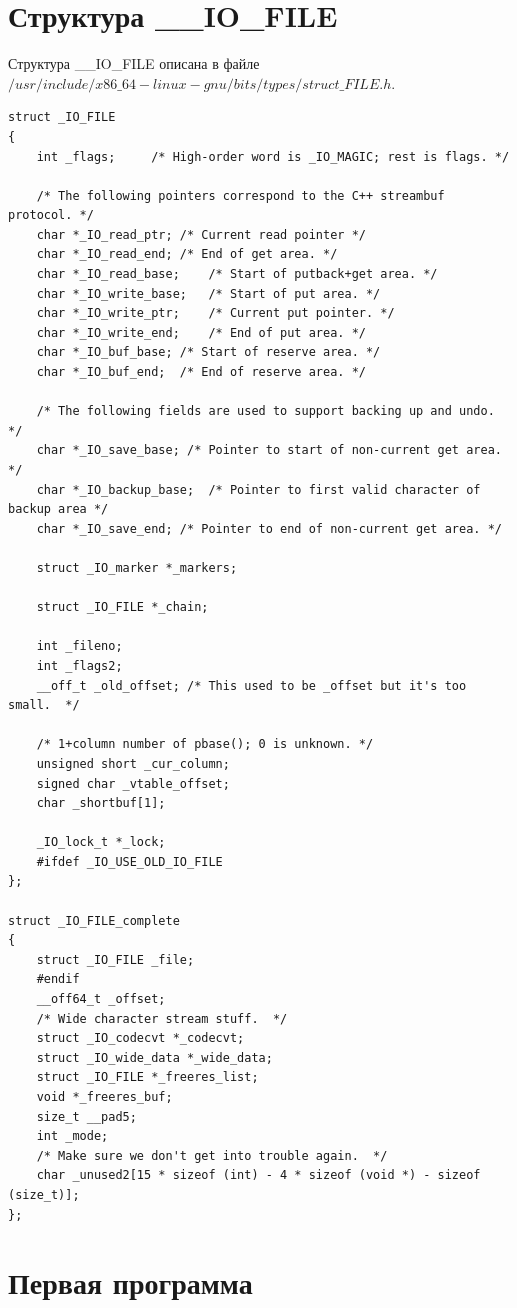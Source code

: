 \documentclass[12pt,a4paper]{scrreprt}
\begin{document}
\section{Структура \_\_IO\_FILE}

Структура \_\_IO\_FILE описана в файле $/usr/include/x86\_64-linux-gnu/bits/types/struct\_FILE.h$.

\begin{lstlisting}[caption=Структура \_\_IO\_FILE]
struct _IO_FILE
{
	int _flags;		/* High-order word is _IO_MAGIC; rest is flags. */
	
	/* The following pointers correspond to the C++ streambuf protocol. */
	char *_IO_read_ptr;	/* Current read pointer */
	char *_IO_read_end;	/* End of get area. */
	char *_IO_read_base;	/* Start of putback+get area. */
	char *_IO_write_base;	/* Start of put area. */
	char *_IO_write_ptr;	/* Current put pointer. */
	char *_IO_write_end;	/* End of put area. */
	char *_IO_buf_base;	/* Start of reserve area. */
	char *_IO_buf_end;	/* End of reserve area. */
	
	/* The following fields are used to support backing up and undo. */
	char *_IO_save_base; /* Pointer to start of non-current get area. */
	char *_IO_backup_base;  /* Pointer to first valid character of backup area */
	char *_IO_save_end; /* Pointer to end of non-current get area. */
	
	struct _IO_marker *_markers;
	
	struct _IO_FILE *_chain;
	
	int _fileno;
	int _flags2;
	__off_t _old_offset; /* This used to be _offset but it's too small.  */
	
	/* 1+column number of pbase(); 0 is unknown. */
	unsigned short _cur_column;
	signed char _vtable_offset;
	char _shortbuf[1];
	
	_IO_lock_t *_lock;
	#ifdef _IO_USE_OLD_IO_FILE
};

struct _IO_FILE_complete
{
	struct _IO_FILE _file;
	#endif
	__off64_t _offset;
	/* Wide character stream stuff.  */
	struct _IO_codecvt *_codecvt;
	struct _IO_wide_data *_wide_data;
	struct _IO_FILE *_freeres_list;
	void *_freeres_buf;
	size_t __pad5;
	int _mode;
	/* Make sure we don't get into trouble again.  */
	char _unused2[15 * sizeof (int) - 4 * sizeof (void *) - sizeof (size_t)];
};
\end{lstlisting}

\clearpage

\section{Первая программа}
	
\end{document}
